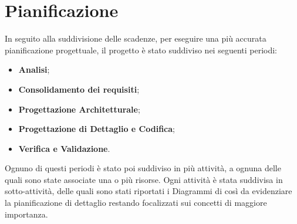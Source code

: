 \section{Pianificazione}
	In seguito alla suddivisione delle scadenze, per eseguire una più accurata pianificazione progettuale, il progetto è stato suddiviso nei seguenti periodi: \\
	\begin{itemize}
		\item \textbf{Analisi};
		\item \textbf{Consolidamento dei requisiti};
		\item \textbf{Progettazione Architetturale};
		\item \textbf{Progettazione di Dettaglio e Codifica};
		\item \textbf{Verifica e Validazione}. \\
	\end{itemize}
	Ognuno di questi periodi è stato poi suddiviso in più attività, a ognuna delle quali sono state associate una o più risorse. Ogni attività è stata suddivisa in sotto-attività, delle quali sono stati riportati i Diagrammi di  così da evidenziare la pianificazione di dettaglio restando focalizzati sui concetti di maggiore importanza.
